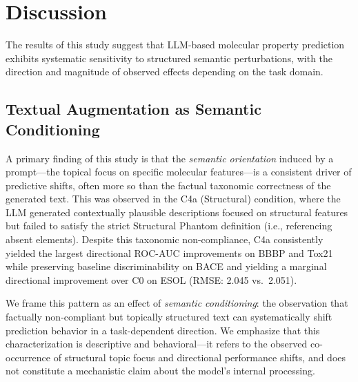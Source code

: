 \section{Discussion}

The results of this study suggest that LLM-based molecular 
property prediction exhibits systematic sensitivity to structured 
semantic perturbations, with the direction and magnitude of 
observed effects depending on the task domain.

\subsection{Textual Augmentation as Semantic Conditioning}
A primary finding of this study is that the \textit{semantic 
orientation} induced by a prompt---the topical focus on specific 
molecular features---is a consistent driver of predictive 
shifts, often more so than the factual taxonomic correctness of the generated 
text. This was observed in the C4a (Structural) condition, 
where the LLM generated contextually plausible descriptions 
focused on structural features but failed to satisfy the strict 
Structural Phantom definition (i.e., referencing absent 
elements). Despite this taxonomic non-compliance, C4a 
consistently yielded the largest directional ROC-AUC 
improvements on BBBP and Tox21 while preserving baseline 
discriminability on BACE and yielding a marginal directional improvement over C0 on ESOL (RMSE: 2.045 vs.\ 2.051).

We frame this pattern as an effect of \textit{semantic conditioning}: the 
observation that factually non-compliant but topically 
structured text can systematically shift prediction behavior 
in a task-dependent direction. We emphasize that this 
characterization is descriptive and behavioral---it refers to 
the observed co-occurrence of structural topic focus and 
directional performance shifts, and does not constitute a 
mechanistic claim about the model's internal processing.

